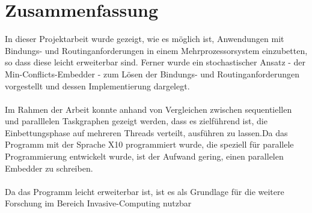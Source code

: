 \chapter{Zusammenfassung}\label{zusammenfassung}

In dieser Projektarbeit wurde gezeigt, wie es möglich ist, Anwendungen mit Bindungs- und Routinganforderungen in einem Mehrprozessorsystem einzubetten, so dass diese leicht erweiterbar sind. Ferner wurde ein stochastischer Ansatz - der Min-Conflicts-Embedder - zum Lösen der Bindungs- und Routinganforderungen vorgestellt und dessen Implementierung dargelegt.\\
\\
Im Rahmen der Arbeit konnte anhand von Vergleichen zwischen sequentiellen und paralllelen Taskgraphen gezeigt werden, dass es zielführend ist, die Einbettungsphase auf mehreren Threads verteilt, ausführen zu lassen.Da das Programm mit der Sprache X10 programmiert wurde, die speziell für parallele Programmierung entwickelt wurde, ist der Aufwand gering, einen parallelen Embedder zu schreiben.\\
\\
Da das Programm leicht erweiterbar ist, ist es als Grundlage für die weitere Forschung im Bereich Invasive-Computing \cite{invasiveComputing} nutzbar

